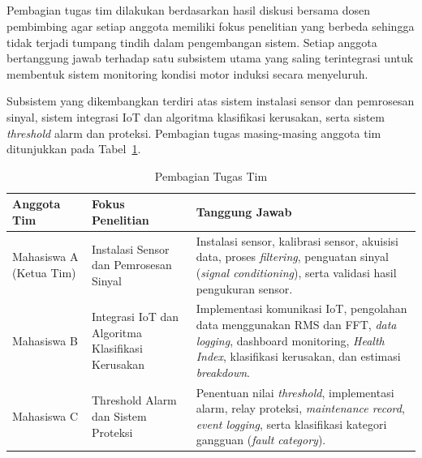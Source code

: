\documentclass{elsinta}
\begin{document}
\subsection{\TeamDivisionTitle}
Pembagian tugas tim dilakukan berdasarkan hasil diskusi bersama dosen pembimbing agar setiap anggota memiliki fokus penelitian yang berbeda sehingga tidak terjadi tumpang tindih dalam pengembangan sistem. Setiap anggota bertanggung jawab terhadap satu subsistem utama yang saling terintegrasi untuk membentuk sistem monitoring kondisi motor induksi secara menyeluruh.

Subsistem yang dikembangkan terdiri atas sistem instalasi sensor dan pemrosesan sinyal, sistem integrasi IoT dan algoritma klasifikasi kerusakan, serta sistem \textit{threshold} alarm dan proteksi. Pembagian tugas masing-masing anggota tim ditunjukkan pada Tabel~\ref{tab:pembagian_tugas}.

\begin{table}[H]
\centering
\caption{Pembagian Tugas Tim}
\label{tab:pembagian_tugas}

\renewcommand{\arraystretch}{1.4}

\begin{tabular}{|p{3cm}|p{4cm}|p{7cm}|}
\hline
\centering\textbf{Anggota Tim} &
\centering\textbf{Fokus Penelitian} &
\centering\arraybackslash\textbf{Tanggung Jawab}
\\
\hline

Mahasiswa A (Ketua Tim)
&
Instalasi Sensor dan Pemrosesan Sinyal
&
Instalasi sensor, kalibrasi sensor, akuisisi data, proses \textit{filtering}, penguatan sinyal (\textit{signal conditioning}), serta validasi hasil pengukuran sensor.
\\
\hline

Mahasiswa B
&
Integrasi IoT dan Algoritma Klasifikasi Kerusakan
&
Implementasi komunikasi IoT, pengolahan data menggunakan RMS dan FFT, \textit{data logging}, dashboard monitoring, \textit{Health Index}, klasifikasi kerusakan, dan estimasi \textit{breakdown}.
\\
\hline

Mahasiswa C
&
Threshold Alarm dan Sistem Proteksi
&
Penentuan nilai \textit{threshold}, implementasi alarm, relay proteksi, \textit{maintenance record}, \textit{event logging}, serta klasifikasi kategori gangguan (\textit{fault category}).
\\
\hline

\end{tabular}
\end{table}
\end{document}
